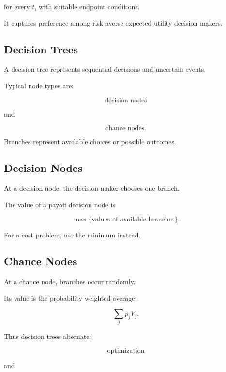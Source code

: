 for every \(t\), with suitable endpoint conditions.

It captures preference among risk-averse expected-utility decision makers.

\subsection{Decision Trees}
\label{subsec:decision-trees}

A decision tree represents sequential decisions and uncertain events.

Typical node types are:

\[
\boxed{
\text{decision nodes}
}
\]

and

\[
\boxed{
\text{chance nodes}.
}
\]

Branches represent available choices or possible outcomes.

\subsection{Decision Nodes}
\label{subsec:decision-nodes}

At a decision node, the decision maker chooses one branch.

The value of a payoff decision node is

\[
\boxed{
\max
\{
\text{values of available branches}
\}.
}
\]

For a cost problem, use the minimum instead.

\subsection{Chance Nodes}
\label{subsec:chance-nodes}

At a chance node, branches occur randomly.

Its value is the probability-weighted average:

\[
\boxed{
\sum_j
p_jV_j.
}
\]

Thus decision trees alternate:

\[
\boxed{
\text{optimization}
}
\]

and

